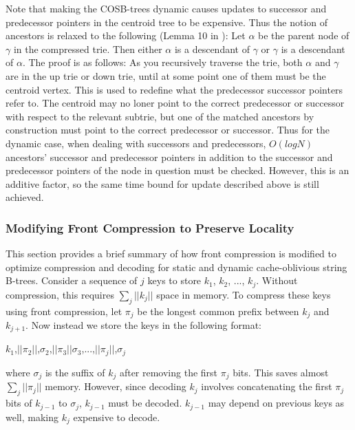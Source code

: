 \documentclass{style}
\begin{document}
Note that making the COSB-trees dynamic causes updates to successor and predecessor pointers in the centroid tree to be expensive. Thus the notion of ancestors is relaxed to the following (Lemma 10 in \cite{BenderFaKu06}): Let $\alpha$ be the parent node of $\gamma$ in the compressed trie. Then either $\alpha$ is a descendant of $\gamma$ or $\gamma$ is a descendant of $\alpha$. The proof is as follows: As you recursively traverse the trie, both $\alpha$ and $\gamma$ are in the up trie or down trie, until at some point one of them must be the centroid vertex. This is used to redefine what the predecessor successor pointers refer to. The centroid may no loner point to the correct predecessor or successor with respect to the relevant subtrie, but one of the matched ancestors by construction must point to the correct predecessor or successor. Thus for the dynamic case, when dealing with successors and predecessors, $O(logN)$ ancestors' successor and predecessor pointers in addition to the successor and predecessor pointers of the node in question must be checked. However, this is an additive factor, so the same time bound for update described above is still achieved.

\subsubsection{Modifying Front Compression to Preserve Locality}
This section provides a brief summary of how front compression is modified to optimize compression and decoding for static and dynamic cache-oblivious string B-trees. Consider a sequence of $j$ keys to store $k_{1}$,  $k_{2}$, ...,  $k_{j}$. Without compression, this requires $\sum_{j}||k_{j}||$ space in memory. To compress these keys using front compression, let $\pi_{j}$ be the longest common prefix between $k_{j}$ and $k_{j+1}$. Now instead we store the keys in the following format:  
\begin{center}
$k_{1}$,$||\pi_{2}||$,$\sigma_{2}$,$||\pi_{3}||$$\sigma_{3}$,...,$||\pi_{j}||$,$\sigma_{j}$
\end{center}
where $\sigma_{j}$ is the suffix of $k_{j}$ after removing the first $\pi_{j}$ bits. This saves almost $\sum_{j}||\pi_{j}||$ memory. However, since decoding $k_{j}$ involves concatenating the first $\pi_{j}$ bits of $k_{j-1}$ to $\sigma_{j}$, $k_{j-1}$ must be decoded. $k_{j-1}$ may depend on previous keys as well, making $k_{j}$ expensive to decode.
\end{document}
